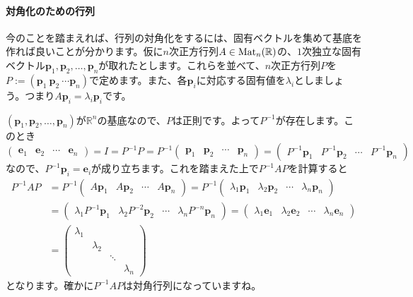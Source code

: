 \paragraph{対角化のための行列}

今のことを踏まえれば、行列の対角化をするには、固有ベクトルを集めて基底を作れば良いことが分かります。仮に$n$次正方行列$A \in \operatorname{Mat}_n(\mathbb{R})$の、$1$次独立な固有ベクトル$\bm{p}_1, \bm{p}_2, \ldots, \bm{p}_n$が取れたとします。これらを並べて、$n$次正方行列$P$を$P := (\bm{p}_1 \  \bm{p}_2 \ \cdots \bm{p}_n)$で定めます。また、各$\bm{p}_i$に対応する固有値を$\lambda_i$としましょう。つまり$A\bm{p}_i = \lambda_i \bm{p}_i$です。

$(\bm{p}_1, \bm{p}_2, \ldots, \bm{p}_n)$が$\mathbb{R}^n$の基底なので、$P$は正則です。よって$P^{-1}$が存在します。このとき
\[
\begin{pmatrix}
\bm{e}_1 & \bm{e}_2 & \cdots & \bm{e}_n
\end{pmatrix}
=
I = P^{-1} P
= P^{-1}
\begin{pmatrix}
\bm{p}_1 & \bm{p}_2 & \cdots & \bm{p}_n
\end{pmatrix}
=
\begin{pmatrix}
P^{-1}\bm{p}_1 & P^{-1}\bm{p}_2 & \cdots & P^{-1}\bm{p}_n
\end{pmatrix}
\]
なので、$P^{-1} \bm{p}_i = \bm{e}_i$が成り立ちます。これを踏まえた上で$P^{-1} A P$を計算すると
\begin{align*}
P^{-1} A P
&= P^{-1}
\begin{pmatrix}
A\bm{p}_1 & A\bm{p}_2 & \cdots & A\bm{p}_n
\end{pmatrix}
= P^{-1}
\begin{pmatrix}
\lambda_1 \bm{p}_1 & \lambda_2 \bm{p}_2 & \cdots & \lambda_n \bm{p}_n
\end{pmatrix} \\
&=
\begin{pmatrix}
\lambda_1 P^{-1} \bm{p}_1 & \lambda_2 P^{-2} \bm{p}_2 & \cdots & \lambda_n P^{-n} \bm{p}_n
\end{pmatrix}
=
\begin{pmatrix}
\lambda_1 \bm{e}_1 & \lambda_2 \bm{e}_2 & \cdots & \lambda_n \bm{e}_n
\end{pmatrix}\\
&=
\begin{pmatrix}
\lambda_1 \\
& \lambda_2 \\
& & \ddots \\
& & & \lambda_n
\end{pmatrix}
\end{align*}
となります。確かに$P^{-1} A P$は対角行列になっていますね。


